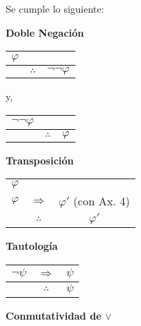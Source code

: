 \documentclass[12pt]{report}
\theoremstyle{largebreak}
\begin{document}
    \begin{propo}
        Se cumple lo siguiente:
        \begin{center}
            \textbf{Doble Negación}
        \end{center}
        \begin{center}
            \begin{tabular}{c c c}
                $\varphi$ &  &  \\
                \hline
                 & $\therefore$ & $\neg\neg\varphi$ \\
            \end{tabular}
        \end{center}
        y,
        \begin{center}
            \begin{tabular}{c c c}
                $\neg\neg\varphi$ &  &  \\
                \hline
                 & $\therefore$ & $\varphi$ \\
            \end{tabular}
        \end{center}
        \begin{center}
            \textbf{Transposición}
        \end{center}
        \begin{center}
            \begin{tabular}{c c c}
                $\varphi$ &  &  \\
                $\varphi$ & $\Rightarrow$ & $\varphi'$ (con Ax. 4) \\
                \hline
                 & $\therefore$ & $\varphi'$ \\
            \end{tabular}
        \end{center}
        \begin{center}
            \textbf{Tautología}
        \end{center}
        \begin{center}
            \begin{tabular}{c c c}
                $\neg\psi$ & $\Rightarrow$ & $\psi$ \\
                \hline
                 & $\therefore$ & $\psi$ \\
            \end{tabular}
        \end{center}
        \begin{center}
            \textbf{Conmutatividad de $\lor$}

\end{center}
\end{propo}
\end{document}
